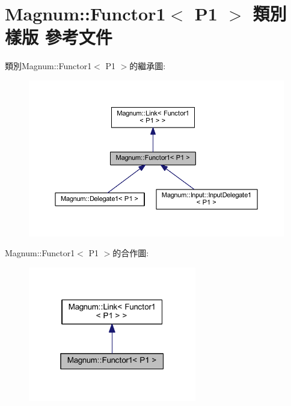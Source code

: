 \hypertarget{class_magnum_1_1_functor1}{}\section{Magnum\+:\+:Functor1$<$ P1 $>$ 類別 樣版 參考文件}
\label{class_magnum_1_1_functor1}


類別\+Magnum\+:\+:Functor1$<$ P1 $>$的繼承圖\+:\nopagebreak
\begin{figure}[H]
\begin{center}
\leavevmode
\includegraphics[width=350pt]{class_magnum_1_1_functor1__inherit__graph}
\end{center}
\end{figure}


Magnum\+:\+:Functor1$<$ P1 $>$的合作圖\+:\nopagebreak
\begin{figure}[H]
\begin{center}
\leavevmode
\includegraphics[width=208pt]{class_magnum_1_1_functor1__coll__graph}
\end{center}
\end{figure}
